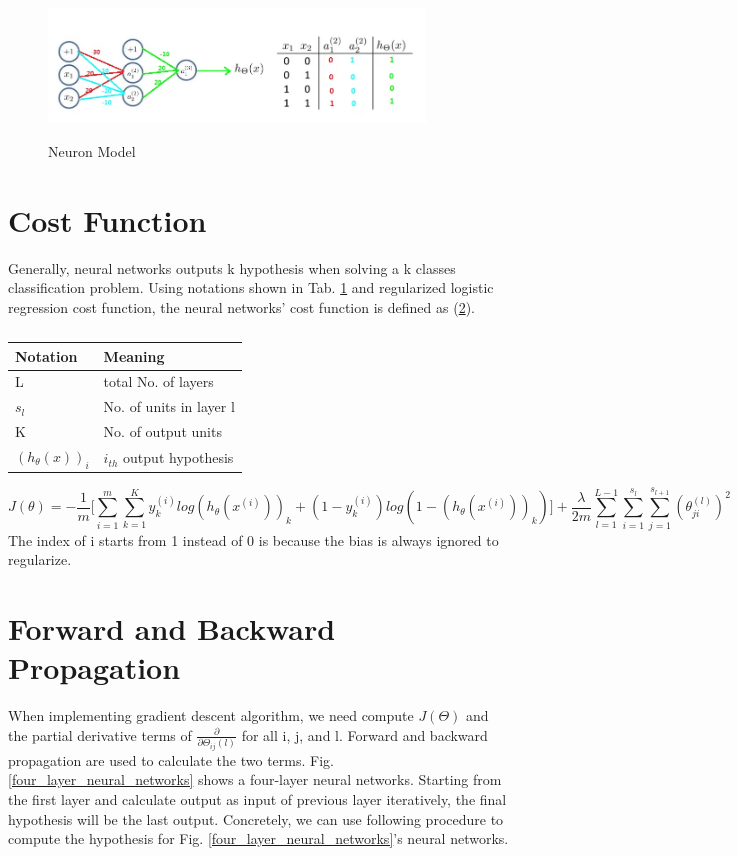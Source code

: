 \documentclass{article}
\begin{document}
\begin{figure}[ht]
  \centering
  \includegraphics[width=10cm]{Figure6.jpg}\\
  \caption{Neuron Model}\label{XOR_neural_networks}
\end{figure}
\section{Cost Function}
Generally, neural networks outputs k hypothesis when solving a k classes classification problem. Using notations shown in Tab. \ref{neural_networks_cost_function_notation} and regularized logistic regression cost function, the neural networks' cost function is defined as (\ref{}).
\begin{table}[hb]
\begin{center}
\caption{}\label{neural_networks_cost_function_notation}
\begin{tabular}{l|l}
\hline
Notation & Meaning\\
\hline
L   & total No. of layers\\
$s_{l}$ & No. of units in layer l\\
K   & No. of output units \\
$(h_{\theta}(x))_{i}$ & $i_{th}$ output hypothesis\\
\hline
\end{tabular}
\end{center}
\end{table}
\begin{equation}\label{neural_networks_cost_function}
J(\theta) = -\frac{1}{m}\biggl[\sum_{i=1}^{m}\sum_{k=1}^{K} y_{k}^{(i)}log(h_{\theta}(x^{(i)}))_{k} + (1 - y_{k}^{(i)})log(1 - (h_{\theta}(x^{(i)}))_{k})\biggr] + \frac{\lambda}{2m}\sum_{l=1}^{L-1}\sum_{i=1}^{s_{l}}\sum_{j=1}^{s_{l+1}}(\theta_{ji}^{(l)})^{2}
\end{equation}
The index of i starts from 1 instead of 0 is because the bias is always ignored to regularize. 

\section{Forward and Backward Propagation}
When implementing gradient descent algorithm, we need compute $J(\Theta)$ and the partial derivative terms of $\frac{\partial}{\partial \Theta_{ij}{(l)}}$ for all i, j, and l. Forward and backward propagation are used to calculate the two terms. Fig. \ref{four_layer_neural_networks} shows a four-layer neural networks. Starting from the first layer and calculate output as input of previous layer iteratively, the final hypothesis will be the last output. Concretely, we can use following procedure to compute the hypothesis for Fig. \ref{four_layer_neural_networks}'s neural networks.
\end{document}
